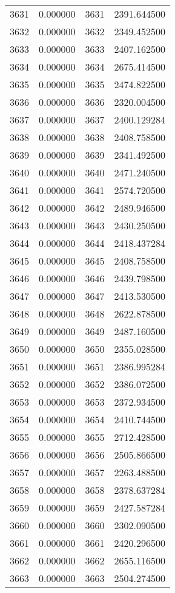 \documentclass[12pt]{article}
\begin{document}
\begin{longtable}{@{}cccc@{}}
3631 & 0.000000 & 3631 & 2391.644500 \\
3632 & 0.000000 & 3632 & 2349.452500 \\
3633 & 0.000000 & 3633 & 2407.162500 \\
3634 & 0.000000 & 3634 & 2675.414500 \\
3635 & 0.000000 & 3635 & 2474.822500 \\
3636 & 0.000000 & 3636 & 2320.004500 \\
3637 & 0.000000 & 3637 & 2400.129284 \\
3638 & 0.000000 & 3638 & 2408.758500 \\
3639 & 0.000000 & 3639 & 2341.492500 \\
3640 & 0.000000 & 3640 & 2471.240500 \\
3641 & 0.000000 & 3641 & 2574.720500 \\
3642 & 0.000000 & 3642 & 2489.946500 \\
3643 & 0.000000 & 3643 & 2430.250500 \\
3644 & 0.000000 & 3644 & 2418.437284 \\
3645 & 0.000000 & 3645 & 2408.758500 \\
3646 & 0.000000 & 3646 & 2439.798500 \\
3647 & 0.000000 & 3647 & 2413.530500 \\
3648 & 0.000000 & 3648 & 2622.878500 \\
3649 & 0.000000 & 3649 & 2487.160500 \\
3650 & 0.000000 & 3650 & 2355.028500 \\
3651 & 0.000000 & 3651 & 2386.995284 \\
3652 & 0.000000 & 3652 & 2386.072500 \\
3653 & 0.000000 & 3653 & 2372.934500 \\
3654 & 0.000000 & 3654 & 2410.744500 \\
3655 & 0.000000 & 3655 & 2712.428500 \\
3656 & 0.000000 & 3656 & 2505.866500 \\
3657 & 0.000000 & 3657 & 2263.488500 \\
3658 & 0.000000 & 3658 & 2378.637284 \\
3659 & 0.000000 & 3659 & 2427.587284 \\
3660 & 0.000000 & 3660 & 2302.090500 \\
3661 & 0.000000 & 3661 & 2420.296500 \\
3662 & 0.000000 & 3662 & 2655.116500 \\
3663 & 0.000000 & 3663 & 2504.274500 \\

\end{longtable}
\end{document}
